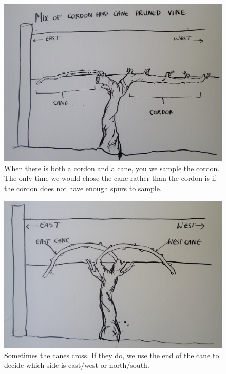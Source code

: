 \documentclass[11pt,letter]{article}
\begin{document}
\begin{figure}%
  \includegraphics[width=\linewidth]{CaneCordonMix.jpg}
  \caption{When there is both a cordon and a cane, you we sample the cordon. The only time we would chose the cane rather than the cordon is if the cordon does not have enough spurs to sample.}
  \label{fig:CordonCane}
\end{figure}

\begin{figure}%
  \includegraphics[width=\linewidth]{CaneCrossing.jpg}
  \caption{Sometimes the canes cross. If they do, we use the end of the cane to decide which side is east/west or north/south.}
  \label{fig:CaneCrossing}
\end{figure}
\end{document}
